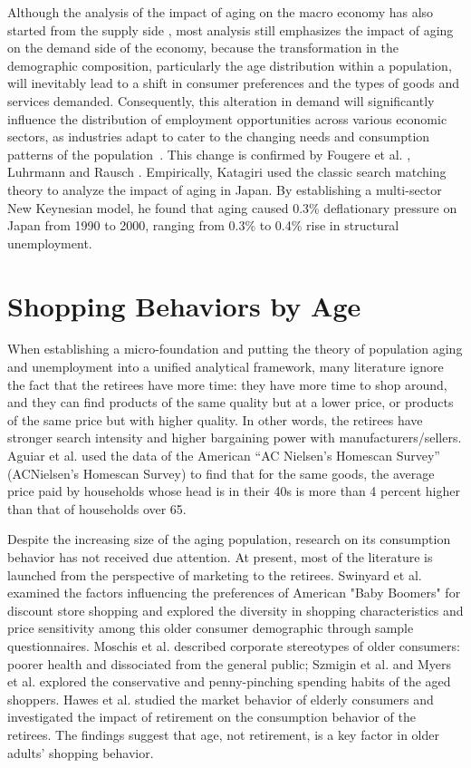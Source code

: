 \documentclass[ %
    final,
    scrbook,
    listoffigures,
    listoftables, 
    glossary]{cu-thesis}
\begin{document}
Although the analysis of the impact of aging on the macro economy has also started from the supply side \cite{maestas2023effect}, most analysis still emphasizes the impact of aging on the demand side of the economy, because the transformation in the demographic composition, particularly the age distribution within a population, will inevitably lead to a shift in consumer preferences and the types of goods and services demanded. Consequently, this alteration in demand will significantly influence the distribution of employment opportunities across various economic sectors, as industries adapt to cater to the changing needs and consumption patterns of the population~\cite{borsch2003labor}. This change is confirmed by Fougere et al. \cite{fougere2007sectoral}, Luhrmann \cite{luhrmann2008effects} and Rausch \cite{rausch2009macroeconomic}. Empirically, Katagiri \cite{katagiri2020aging} used the classic search matching theory to analyze the impact of aging in Japan. By establishing a multi-sector New Keynesian model, he found that aging caused 0.3\% deflationary pressure on Japan from 1990 to 2000, ranging from 0.3\% to 0.4\% rise in structural unemployment.

\section{Shopping Behaviors by Age}
\label{shopping_by_age}
When establishing a micro-foundation and putting the theory of population aging and unemployment into a unified analytical framework, many literature ignore the fact that the retirees have more time: they have more time to shop around, and they can find products of the same quality but at a lower price, or products of the same price but with higher quality. In other words, the retirees have stronger search intensity and higher bargaining power with manufacturers/sellers. Aguiar et al. \cite{aguiar2007life} used the data of the American ``AC Nielsen's Homescan Survey'' (ACNielsen's Homescan Survey) to find that for the same goods, the average price paid by households whose head is in their 40s is more than 4 percent higher than that of households over 65. 

Despite the increasing size of the aging population, research on its consumption behavior has not received due attention. At present, most of the literature is launched from the perspective of marketing to the retirees. Swinyard et al. \cite{swinyard1994six} examined the factors influencing the preferences of American "Baby Boomers" for discount store shopping and explored the diversity in shopping characteristics and price sensitivity among this older consumer demographic through sample questionnaires. Moschis et al. \cite{moschis1997targeting} described corporate stereotypes of older consumers: poorer health and dissociated from the general public; Szmigin et al. \cite{szmigin2001learning} and Myers et al. \cite{myers2008understanding} explored the conservative and penny-pinching spending habits of the aged shoppers. Hawes et al. \cite{hawes1984understanding} studied the market behavior of elderly consumers and investigated the impact of retirement on the consumption behavior of the retirees. The findings suggest that age, not retirement, is a key factor in older adults' shopping behavior. 
\end{document}
